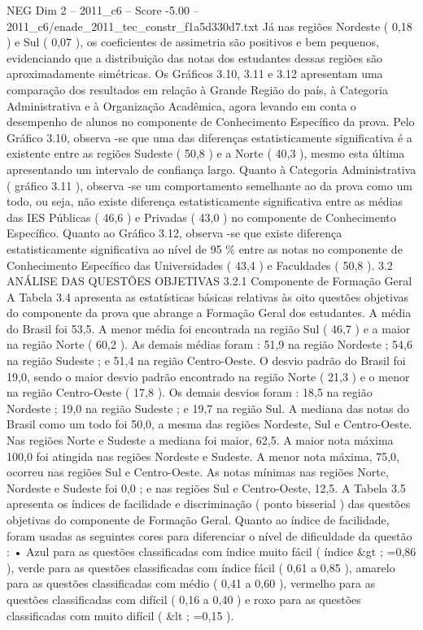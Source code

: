 \begin{textsample}{NEG Dim 2 – 2011\_c6 – Score -5.00 – 2011\_c6/enade\_2011\_tec\_constr\_f1a5d330d7.txt}
Já nas regiões Nordeste ( 0,18 ) e Sul ( 0,07 ), os coeficientes de assimetria são positivos e bem pequenos, evidenciando que a distribuição das notas dos estudantes dessas regiões são aproximadamente simétricas.
Os Gráficos 3.10, 3.11 e 3.12 apresentam uma comparação dos resultados em relação à Grande Região do país, à Categoria Administrativa e à Organização Acadêmica, agora levando em conta o desempenho de alunos no componente de Conhecimento Específico da prova.
Pelo Gráfico 3.10, observa -se que uma das diferenças estatisticamente significativa é a existente entre as regiões Sudeste ( 50,8 ) e a Norte ( 40,3 ), mesmo esta última apresentando um intervalo de confiança largo.
Quanto à Categoria Administrativa ( gráfico 3.11 ), observa -se um comportamento semelhante ao da prova como um todo, ou seja, não existe diferença estatisticamente significativa entre as médias das IES Públicas ( 46,6 ) e Privadas ( 43,0 ) no componente de Conhecimento Específico.
Quanto ao Gráfico 3.12, observa -se que existe diferença estatisticamente significativa ao nível de 95 \% entre as notas no componente de Conhecimento Específico das Universidades ( 43,4 ) e Faculdades ( 50,8 ). 3.2 ANÁLISE DAS QUESTÕES OBJETIVAS 3.2.1 Componente de Formação Geral A Tabela 3.4 apresenta as estatísticas básicas relativas às oito questões objetivas do componente da prova que abrange a Formação Geral dos estudantes.
A média do Brasil foi 53,5.
A menor média foi encontrada na região Sul ( 46,7 ) e a maior na região Norte ( 60,2 ).
As demais médias foram : 51,9 na região Nordeste ; 54,6 na região Sudeste ; e 51,4 na região Centro-Oeste.
O desvio padrão do Brasil foi 19,0, sendo o maior desvio padrão encontrado na região Norte ( 21,3 ) e o menor na região Centro-Oeste ( 17,8 ).
Os demais desvios foram : 18,5 na região Nordeste ; 19,0 na região Sudeste ; e 19,7 na região Sul.
A mediana das notas do Brasil como um todo foi 50,0, a mesma das regiões Nordeste, Sul e Centro-Oeste.
Nas regiões Norte e Sudeste a mediana foi maior, 62,5.
A maior nota máxima 100,0 foi atingida nas regiões Nordeste e Sudeste.
A menor nota máxima, 75,0, ocorreu nas regiões Sul e Centro-Oeste.
As notas mínimas nas regiões Norte, Nordeste e Sudeste foi 0,0 ; e nas regiões Sul e Centro-Oeste, 12,5.
A Tabela 3.5 apresenta os índices de facilidade e discriminação ( ponto bisserial ) das questões objetivas do componente de Formação Geral.
Quanto ao índice de facilidade, foram usadas as seguintes cores para diferenciar o nível de dificuldade da questão : • Azul para as questões classificadas com índice muito fácil ( índice \&gt ; =0,86 ), verde para as questões classificadas com índice fácil ( 0,61 a 0,85 ), amarelo para as questões classificadas com médio ( 0,41 a 0,60 ), vermelho para as questões classificadas com difícil ( 0,16 a 0,40 ) e roxo para as questões classificadas com muito difícil ( \&lt ; =0,15 ).

\end{textsample}
